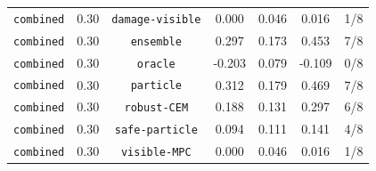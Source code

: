 \documentclass{article}
\begin{document}
\begin{center}
\begin{tabular}{llccccc}
\texttt{combined} & 0.30 & \texttt{damage-visible} & 0.000 & 0.046 & 0.016 & 1/8 \\
\texttt{combined} & 0.30 & \texttt{ensemble} & 0.297 & 0.173 & 0.453 & 7/8 \\
\texttt{combined} & 0.30 & \texttt{oracle} & -0.203 & 0.079 & -0.109 & 0/8 \\
\texttt{combined} & 0.30 & \texttt{particle} & 0.312 & 0.179 & 0.469 & 7/8 \\
\texttt{combined} & 0.30 & \texttt{robust-CEM} & 0.188 & 0.131 & 0.297 & 6/8 \\
\texttt{combined} & 0.30 & \texttt{safe-particle} & 0.094 & 0.111 & 0.141 & 4/8 \\
\texttt{combined} & 0.30 & \texttt{visible-MPC} & 0.000 & 0.046 & 0.016 & 1/8 \\
\bottomrule
\end{tabular}
\end{center}
\end{document}
